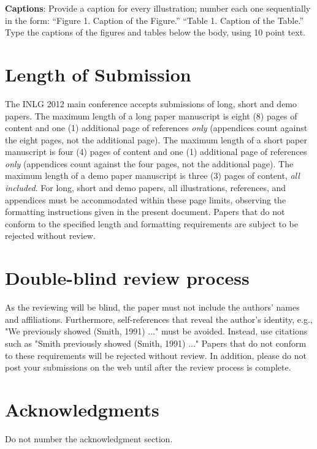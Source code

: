 \documentclass[11pt,letterpaper]{article}
\begin{document}
{\bf Captions}: Provide a caption for every illustration; number each one
sequentially in the form:  ``Figure 1. Caption of the Figure.'' ``Table 1.
Caption of the Table.''  Type the captions of the figures and 
tables below the body, using 10 point text.  

\section{Length of Submission}
\label{sec:length}

The INLG 2012 main conference accepts submissions of long, short and
demo papers.  The maximum length of a long paper manuscript is eight
(8) pages of content and one (1) additional page of references
\emph{only} 
(appendices count against the eight pages, not the additional page).
The maximum length of a short paper manuscript is four (4) pages of
content and one (1) additional page of references \emph{only} (appendices
count against the four pages, not the additional page).  The maximum
length of a  demo paper manuscript is three (3) pages of content, \emph{all
included}. 
For long, short and demo
papers, all illustrations, references, and appendices must be
accommodated within these page limits, observing the formatting
instructions given in the present document.  Papers that do not
conform to the specified length and formatting requirements are
subject to be rejected without review.

\section{Double-blind review process}
\label{sec:blind}

As the reviewing will be blind, the paper must not include the authors' names and affiliations. Furthermore, self-references that reveal the author's identity, e.g., "We previously showed (Smith, 1991) ..." must be avoided. Instead, use citations such as "Smith previously showed (Smith, 1991) ..." Papers that do not conform to these requirements will be rejected without review. In addition, please do not post your submissions on the web until after the review process is complete.

\section*{Acknowledgments}

Do not number the acknowledgment section.
\end{document}
